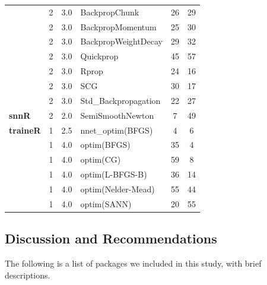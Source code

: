 \begin{Schunk}
\begin{table}
\begin{tabular}[t]{>{\bfseries}lcclcc}
 & 2 & 3.0 & BackpropChunk & 26 & 29\\

 & 2 & 3.0 & BackpropMomentum & 25 & 30\\

 & 2 & 3.0 & BackpropWeightDecay & 29 & 32\\

 & 2 & 3.0 & Quickprop & 45 & 57\\

 & 2 & 3.0 & Rprop & 24 & 16\\

 & 2 & 3.0 & SCG & 30 & 17\\

\multirow{-8}{*}{\raggedright\arraybackslash RSNNS} & 2 & 3.0 & Std\_Backpropagation & 22 & 27\\
\cmidrule{1-6}
snnR & 2 & 2.0 & SemiSmoothNewton & 7 & 49\\
\cmidrule{1-6}
traineR & 1 & 2.5 & nnet\_optim(BFGS) & 4 & 6\\
\cmidrule{1-6}
 & 1 & 4.0 & optim(BFGS) & 35 & 4\\

 & 1 & 4.0 & optim(CG) & 59 & 8\\

 & 1 & 4.0 & optim(L-BFGS-B) & 36 & 14\\

 & 1 & 4.0 & optim(Nelder-Mead) & 55 & 44\\

\multirow{-5}{*}{\raggedright\arraybackslash validann} & 1 & 4.0 & optim(SANN) & 20 & 55\\
\bottomrule
\end{tabular}
\end{table}

\end{Schunk}

\hypertarget{discussion-and-recommendations}{%
\subsection{Discussion and
Recommendations}\label{discussion-and-recommendations}}

The following is a list of packages we included in this study, with
brief descriptions.

